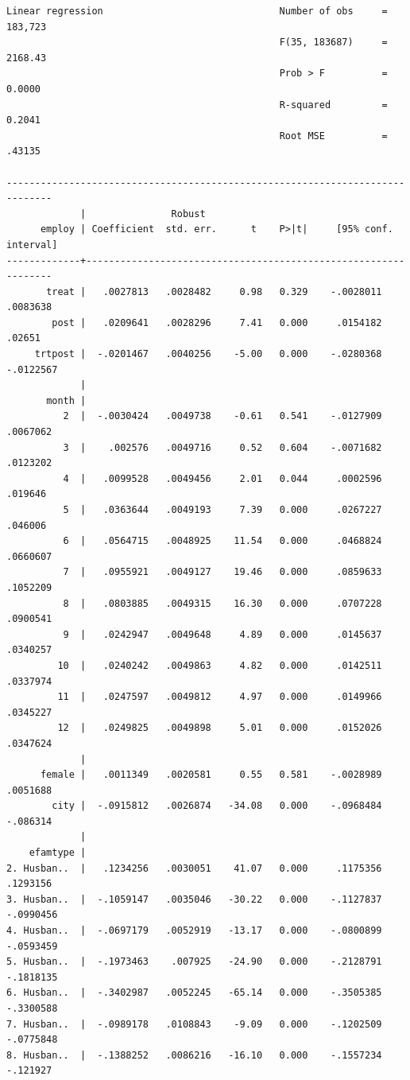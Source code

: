 \documentclass[
  letterpaper,
  DIV=11,
  numbers=noendperiod]{scrartcl}
\begin{document}
\begin{verbatim}
Linear regression                               Number of obs     =    183,723
                                                F(35, 183687)     =    2168.43
                                                Prob > F          =     0.0000
                                                R-squared         =     0.2041
                                                Root MSE          =     .43135

------------------------------------------------------------------------------
             |               Robust
      employ | Coefficient  std. err.      t    P>|t|     [95% conf. interval]
-------------+----------------------------------------------------------------
       treat |   .0027813   .0028482     0.98   0.329    -.0028011    .0083638
        post |   .0209641   .0028296     7.41   0.000     .0154182      .02651
     trtpost |  -.0201467   .0040256    -5.00   0.000    -.0280368   -.0122567
             |
       month |
          2  |  -.0030424   .0049738    -0.61   0.541    -.0127909    .0067062
          3  |    .002576   .0049716     0.52   0.604    -.0071682    .0123202
          4  |   .0099528   .0049456     2.01   0.044     .0002596     .019646
          5  |   .0363644   .0049193     7.39   0.000     .0267227     .046006
          6  |   .0564715   .0048925    11.54   0.000     .0468824    .0660607
          7  |   .0955921   .0049127    19.46   0.000     .0859633    .1052209
          8  |   .0803885   .0049315    16.30   0.000     .0707228    .0900541
          9  |   .0242947   .0049648     4.89   0.000     .0145637    .0340257
         10  |   .0240242   .0049863     4.82   0.000     .0142511    .0337974
         11  |   .0247597   .0049812     4.97   0.000     .0149966    .0345227
         12  |   .0249825   .0049898     5.01   0.000     .0152026    .0347624
             |
      female |   .0011349   .0020581     0.55   0.581    -.0028989    .0051688
        city |  -.0915812   .0026874   -34.08   0.000    -.0968484    -.086314
             |
    efamtype |
2. Husban..  |   .1234256   .0030051    41.07   0.000     .1175356    .1293156
3. Husban..  |  -.1059147   .0035046   -30.22   0.000    -.1127837   -.0990456
4. Husban..  |  -.0697179   .0052919   -13.17   0.000    -.0800899   -.0593459
5. Husban..  |  -.1973463    .007925   -24.90   0.000    -.2128791   -.1818135
6. Husban..  |  -.3402987   .0052245   -65.14   0.000    -.3505385   -.3300588
7. Husban..  |  -.0989178   .0108843    -9.09   0.000    -.1202509   -.0775848
8. Husban..  |  -.1388252   .0086216   -16.10   0.000    -.1557234    -.121927

\end{verbatim}
\end{document}
